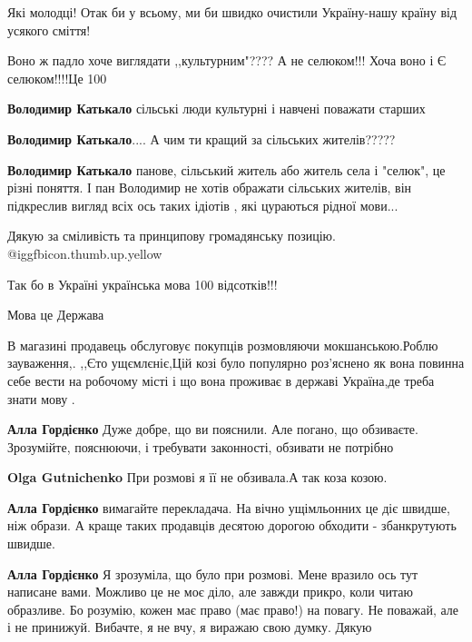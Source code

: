 \begin{itemize}
Які молодці! Отак би у всьому, ми би швидко очистили Україну-нашу країну від усякого сміття!

Воно ж падло хоче виглядати ,,культурним"???? А не селюком!!! Хоча воно і Є селюком!!!!Це 100%

\begin{itemize} %
\textbf{Володимир Катькало} сільські люди культурні і навчені поважати старших

\textbf{Володимир Катькало}.... А чим ти кращий за сільських жителів?????

\textbf{Володимир Катькало} панове, сільський житель або житель села і "селюк", це різні поняття. І пан Володимир не хотів ображати сільських жителів, він підкреслив вигляд всіх ось таких ідіотів , які цураються рідної мови...
\end{itemize} %

Дякую за сміливість та принципову громадянську позицію. @igg{fbicon.thumb.up.yellow} 

Так бо в Україні українська мова 100 відсотків!!!

Мова це Держава


В магазині продавець обслуговує покупців розмовляючи мокшанською.Роблю
зауваження,. ,,Єто ущємлєніє,Цій козі було популярно роз'яснено як вона повинна
себе вести на робочому місті і що вона проживає в державі Україна,де треба
знати мову .

\begin{itemize} %
\textbf{Алла Гордієнко} Дуже добре, що ви пояснили. Але погано, що обзиваєте. Зрозумійте, пояснюючи, і требувати законності, обзивати не потрібно

\begin{itemize} %
\textbf{Olga Gutnichenko} При розмові я її не обзивала.А так коза козою.

\textbf{Алла Гордієнко} вимагайте перекладача. На вічно ущімльонних це діє швидше, ніж образи. А краще таких продавців десятою дорогою обходити - збанкрутують швидше.

\textbf{Алла Гордієнко} Я зрозуміла, що було при розмові. Мене вразило ось тут написане вами. Можливо це не моє діло, але завжди прикро, коли читаю образливе. Бо розумію, кожен має право (має право!) на повагу. Не поважай, але і не принижуй. Вибачте, я не вчу, я виражаю свою думку. Дякую
\end{itemize} %


\end{itemize}
\end{itemize}
